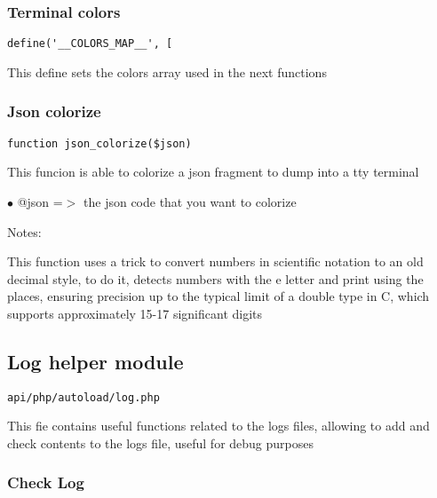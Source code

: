\documentclass[a4paper]{article}
\begin{document}
\hypertarget{toc158}{}
\subsubsection{Terminal colors}

\begin{lstlisting}
define('__COLORS_MAP__', [
\end{lstlisting}

This define sets the colors array used in the next functions

\hypertarget{toc159}{}
\subsubsection{Json colorize}

\begin{lstlisting}
function json_colorize($json)
\end{lstlisting}

This funcion is able to colorize a json fragment to dump into a tty terminal

\begin{compactitem}
\item[\color{myblue}$\bullet$] @json =$>$ the json code that you want to colorize
\end{compactitem}

Notes:

This function uses a trick to convert numbers in scientific notation to an old
decimal style, to do it, detects numbers with the e letter and print using the
places, ensuring precision up to the typical limit of a double type in C, which
supports approximately 15-17 significant digits

\hypertarget{toc160}{}
\subsection{Log helper module}

\begin{lstlisting}
api/php/autoload/log.php
\end{lstlisting}

This fie contains useful functions related to the logs files, allowing to add and check contents
to the logs file, useful for debug purposes

\hypertarget{toc161}{}
\subsubsection{Check Log}
\end{document}
